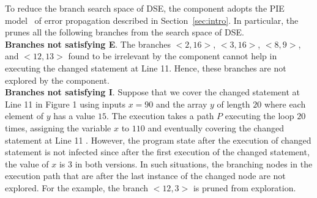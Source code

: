 To reduce the branch search space of DSE, the  component adopts the PIE model~\cite{voas} of error propagation described in Section~\ref{sec:intro}. In particular, the  prunes all the following branches from the search space of DSE.
\\ \textbf{Branches not satisfying E}. The branches $<2, 16>$, $<3, 16>$, $<8, 9>$, and $<12, 13>$ found to be irrelevant by the  component cannot help in executing the changed statement at Line 11. Hence, these branches are not explored by the  component. 
\\ \textbf{Branches not satisfying I}. Suppose
that we cover the changed statement at Line 11 in Figure 1 using inputs
$x=90$ and the array $y$ of length $20$ where each element of $y$
has a value $15$. The execution takes a path $P$ executing the
loop $20$ times, assigning the variable $x$ to $110$ and eventually
covering the changed statement at Line 11 . However, the program state after the
execution of  changed statement is not infected since after the first execution
of the changed statement, the value of $x$ is $3$ in both versions. In such situations, the branching nodes in the execution path
that are after the last instance of the changed node are not explored. For the example, the branch $<12, 3>$ is pruned from exploration.







